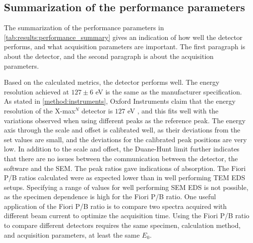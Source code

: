 \subsection{Summarization of the performance parameters}
\label{discussion:summarization_of_the_performance_parameters}

The summarization of the performance parameters in \cref{tab:results:performance_summary} gives an indication of how well the detector performs, and what acquisition parameters are important.
The first paragraph is about the detector, and the second paragraph is about the acquisition parameters.


Based on the calculated metrics, the detector performs well.
The energy resolution achieved at $127 \pm6$ eV is the same as the manufacturer specification.
As stated in \cref{method:instruments}, Oxford Instruments claim that the energy resolution of the X-max$^N$ detector is $127$ eV \cite{xmaxn_datasheet}, and this fits well with the variations observed when using different peaks as the reference peak.
The energy axis through the scale and offset is calibrated well, as their deviations from the set values are small, and the deviations for the calibrated peak positions are very low.
In addition to the scale and offset, the Duane-Hunt limit further indicates that there are no issues between the communication between the detector, the software and the SEM.
The peak ratios gave indications of absorption.
The Fiori P/B ratios calculated were as expected lower than in well performing TEM EDS setups.
Specifying a range of values for well performing SEM EDS is not possible, as the specimen dependence is high for the Fiori P/B ratio.
One useful application of the Fiori P/B ratio is to compare two spectra acquired with different beam current to optimize the acquisition time.
Using the Fiori P/B ratio to compare different detectors requires the same specimen, calculation method, and acquisition parameters, at least the same $E_0$.


